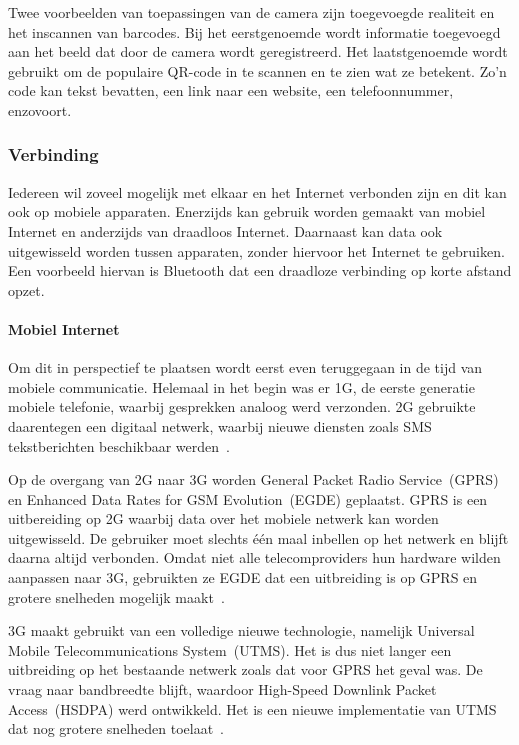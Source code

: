 Twee voorbeelden van toepassingen van de camera zijn toegevoegde realiteit en het inscannen van barcodes.
Bij het eerstgenoemde wordt informatie toegevoegd aan het beeld dat door de camera wordt geregistreerd.
Het laatstgenoemde wordt gebruikt om de populaire QR-code in te scannen en te zien wat ze betekent.
Zo'n code kan tekst bevatten, een link naar een website, een telefoonnummer, enzovoort. 

\subsubsection{Verbinding}
Iedereen wil zoveel mogelijk met elkaar en het Internet verbonden zijn en dit kan ook op mobiele apparaten. 
Enerzijds kan gebruik worden gemaakt van mobiel Internet en anderzijds van draadloos Internet.
Daarnaast kan data ook uitgewisseld worden tussen apparaten, zonder hiervoor het Internet te gebruiken.
Een voorbeeld hiervan is Bluetooth dat een draadloze verbinding op korte afstand opzet.

\paragraph{Mobiel Internet}
Om dit in perspectief te plaatsen wordt eerst even teruggegaan in de tijd van mobiele communicatie.
Helemaal in het begin was er 1G, de eerste generatie mobiele telefonie, waarbij gesprekken analoog werd verzonden.
2G gebruikte daarentegen een digitaal netwerk, waarbij nieuwe diensten zoals SMS tekstberichten beschikbaar werden~\cite{Miami2008}.

Op de overgang van 2G naar 3G worden General Packet Radio Service~(GPRS) en Enhanced Data Rates for GSM Evolution~(EGDE) geplaatst.
GPRS is een uitbereiding op 2G waarbij data over het mobiele netwerk kan worden uitgewisseld.
De gebruiker moet slechts één maal inbellen op het netwerk en blijft daarna altijd verbonden.
Omdat niet alle telecomproviders hun hardware wilden aanpassen naar 3G, gebruikten ze EGDE dat een uitbreiding is op GPRS en grotere snelheden mogelijk maakt~\cite{Lauwers2007}.

3G maakt gebruikt van een volledige nieuwe technologie, namelijk Universal Mobile Telecommunications System~(UTMS).
Het is dus niet langer een uitbreiding op het bestaande netwerk zoals dat voor GPRS het geval was.
De vraag naar bandbreedte blijft, waardoor High-Speed Downlink Packet Access~(HSDPA) werd ontwikkeld. 
Het is een nieuwe implementatie van UTMS dat nog grotere snelheden toelaat~\cite{Lauwers2007}.

